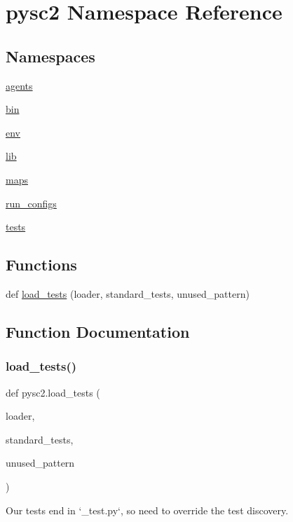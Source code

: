 \hypertarget{namespacepysc2}{}\section{pysc2 Namespace Reference}
\label{namespacepysc2}
\subsection*{Namespaces}
\begin{DoxyCompactItemize}
\item 
 \mbox{\hyperlink{namespacepysc2_1_1agents}{agents}}
\item 
 \mbox{\hyperlink{namespacepysc2_1_1bin}{bin}}
\item 
 \mbox{\hyperlink{namespacepysc2_1_1env}{env}}
\item 
 \mbox{\hyperlink{namespacepysc2_1_1lib}{lib}}
\item 
 \mbox{\hyperlink{namespacepysc2_1_1maps}{maps}}
\item 
 \mbox{\hyperlink{namespacepysc2_1_1run__configs}{run\+\_\+configs}}
\item 
 \mbox{\hyperlink{namespacepysc2_1_1tests}{tests}}
\end{DoxyCompactItemize}
\subsection*{Functions}
\begin{DoxyCompactItemize}
\item 
def \mbox{\hyperlink{namespacepysc2_a4969f2ab86cf3a085754b1077889ed94}{load\+\_\+tests}} (loader, standard\+\_\+tests, unused\+\_\+pattern)
\end{DoxyCompactItemize}


\subsection{Function Documentation}
\mbox{\label{namespacepysc2_a4969f2ab86cf3a085754b1077889ed94}} 
\subsubsection{\texorpdfstring{load\+\_\+tests()}{load\_tests()}}
{\footnotesize\ttfamily def pysc2.\+load\+\_\+tests (\begin{DoxyParamCaption}\item[{}]{loader,  }\item[{}]{standard\+\_\+tests,  }\item[{}]{unused\+\_\+pattern }\end{DoxyParamCaption})}

\begin{DoxyVerb}Our tests end in `_test.py`, so need to override the test discovery.\end{DoxyVerb}
 